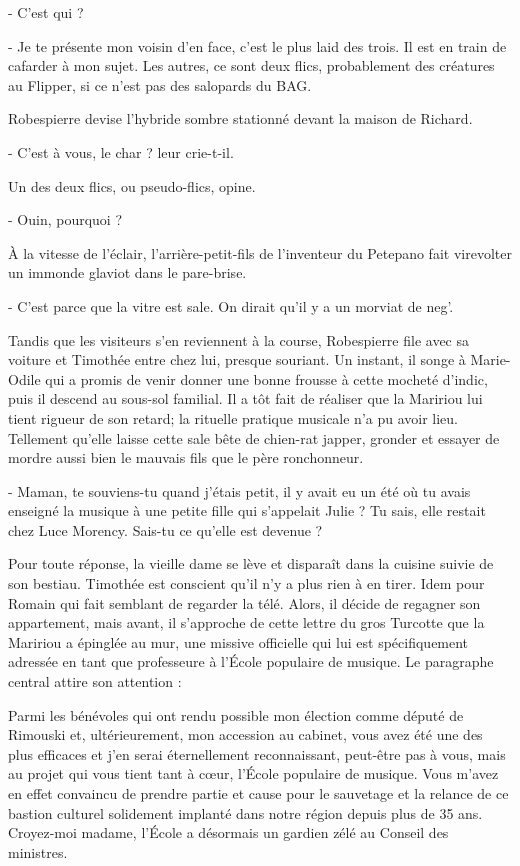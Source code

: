 - C’est qui ?

- Je te présente mon voisin d’en face, c’est le plus laid des trois. Il est en train de cafarder à mon sujet. Les autres, ce sont deux flics, probablement des créatures au Flipper, si ce n’est pas des salopards du BAG.

Robespierre devise l’hybride sombre stationné devant la maison de Richard.

- C’est à vous, le char ? leur crie-t-il.

Un des deux flics, ou pseudo-flics, opine.

- Ouin, pourquoi ?

À la vitesse de l’éclair, l’arrière-petit-fils de l’inventeur du Petepano fait virevolter un immonde glaviot dans le pare-brise.

- C’est parce que la vitre est sale. On dirait qu’il y a un morviat de neg’.

Tandis que les visiteurs s’en reviennent à la course, Robespierre file avec sa voiture et Timothée entre chez lui, presque souriant. Un instant, il songe à Marie-Odile qui a promis de venir donner une bonne frousse à cette mocheté d’indic, puis il descend au sous-sol familial. Il a tôt fait de réaliser que la Maririou lui tient rigueur de son retard; la rituelle pratique musicale n’a pu avoir lieu. Tellement qu’elle laisse cette sale bête de chien-rat japper, gronder et essayer de mordre aussi bien le mauvais fils que le père ronchonneur.

- Maman, te souviens-tu quand j’étais petit, il y avait eu un été où tu avais enseigné la musique à une petite fille qui s’appelait Julie ? Tu sais, elle restait chez Luce Morency. Sais-tu ce qu’elle est devenue ?

Pour toute réponse, la vieille dame se lève et disparaît dans la cuisine suivie de son bestiau. Timothée est conscient qu’il n’y a plus rien à en tirer. Idem pour Romain qui fait semblant de regarder la télé. Alors, il décide de regagner son appartement, mais avant, il s’approche de cette lettre du gros Turcotte que la Maririou a épinglée au mur, une missive officielle qui lui est spécifiquement adressée en tant que professeure à l’École populaire de musique. Le paragraphe central attire son attention :

    Parmi les bénévoles qui ont rendu possible mon élection comme député de Rimouski et, ultérieurement, mon accession au cabinet, vous avez été une des plus efficaces et j’en serai éternellement reconnaissant, peut-être pas à vous, mais au projet qui vous tient tant à cœur, l’École populaire de musique. Vous m’avez en effet convaincu de prendre partie et cause pour le sauvetage et la relance de ce bastion culturel solidement implanté dans notre région depuis plus de 35 ans. Croyez-moi madame, l’École a désormais un gardien zélé au Conseil des ministres.

